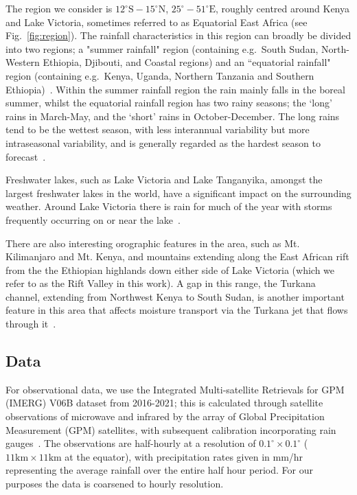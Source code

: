 \documentclass{article}
\begin{document}
The region we consider is $12^{\circ}\text{S}-15^{\circ}\text{N}$, $25^{\circ}-51^{\circ}\text{E}$, roughly centred around Kenya and Lake Victoria, sometimes referred to as Equatorial East Africa (see Fig.~\ref{fig:region}). The rainfall characteristics in this region can broadly be divided into two regions; a "summer rainfall" region (containing e.g.~South Sudan, North-Western Ethiopia, Djibouti, and Coastal regions) and an ``equatorial rainfall" region (containing e.g.~Kenya, Uganda, Northern Tanzania and Southern Ethiopia)~\citep{nicholson_climate_2017}. Within the summer rainfall region the rain mainly falls in the boreal summer, whilst the equatorial rainfall region has two rainy seasons; the `long' rains in March-May, and the `short' rains in October-December. The long rains tend to be the wettest season, with less interannual variability but more intraseasonal variability, and is generally regarded as the hardest season to forecast~\citep{nicholson_climate_2017, walker_skill_2019, kilavi_extreme_2018}.

Freshwater lakes, such as Lake Victoria and Lake Tanganyika, amongst the largest freshwater lakes in the world, have a significant impact on the surrounding weather. Around Lake Victoria there is rain for much of the year with storms frequently occurring on or near the lake~\citep{macleod_drivers_2021, chamberlain_forecasting_2014, woodhams_identifying_2019}.

There are also interesting orographic features in the area, such as Mt. Kilimanjaro and Mt. Kenya, and mountains extending along the East African rift from the the Ethiopian highlands down either side of Lake Victoria (which we refer to as the Rift Valley in this work). A gap in this range, the Turkana channel, extending from Northwest Kenya to South Sudan, is another important feature in this area that affects moisture transport via the Turkana jet that flows through it~\citep{nicholson_turkana_2016}.


\subsection{Data}

\label{sec:data}


For observational data, we use the Integrated Multi-satellite Retrievals for GPM (IMERG) V06B dataset from 2016-2021; this is calculated through satellite observations of microwave and infrared by the array of Global Precipitation Measurement (GPM) satellites, with subsequent calibration incorporating rain gauges~\citep{huffman_integrated_2023}. The observations are half-hourly at a resolution of $0.1^{\circ} \times 0.1^{\circ}$ ($11\text{km} \times 11\text{km}$ at the equator), with precipitation rates given in mm/hr representing the average rainfall over the entire half hour period. For our purposes the data is coarsened to hourly resolution.
\end{document}
